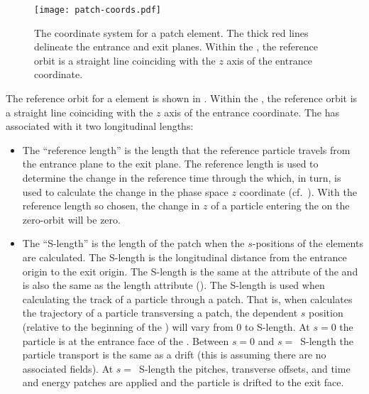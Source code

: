 
\begin{figure}[!b]
  \centering
  \texttt{[image: patch-coords.pdf]}
  \caption[The coordinate system for a patch element.]
{The coordinate system for a patch element. The thick red lines
delineate the entrance and exit planes. Within the , the reference
orbit is a straight line coinciding with the $z$ axis of the entrance coordinate.}
  \label{f:patch.coords}
\end{figure}

The reference orbit for a  element is shown in
.  Within the , the reference orbit is
a straight line coinciding with the $z$ axis of the entrance
coordinate. The  has associated with it two longitudinal
lengths: 
\begin{itemize}
\item
The ``reference length'' is the length that the reference particle
travels from the entrance plane to the exit plane. The reference
length is used to determine the change in the reference time through
the  which, in turn, is used to calculate the change in the
phase space $z$ coordinate (cf.~). With the reference length
so chosen, the change in $z$ of a particle entering the  on
the zero-orbit will be zero.
\item
The ``S-length'' is the length of the patch when the $s$-positions of
the elements are calculated. The S-length is the longitudinal distance
from the entrance origin to the exit origin. The S-length is the same
at the  attribute of the  and is also the same
as the  length attribute (). The S-length is used when
calculating the track of a particle through a patch. That is, when
\bmad calculates the trajectory of a particle transversing a patch,
the dependent $s$ position (relative to the beginning of the
) will vary from 0 to S-length. At $s = 0$ the particle is
at the entrance face of the . Between $s = 0$ and $s
=$~S-length the particle transport is the same as a drift (this is
assuming there are no associated fields). At $s =$~S-length the
pitches, transverse offsets, and time and energy patches are applied
and the particle is drifted to the exit face.
\end{itemize}


